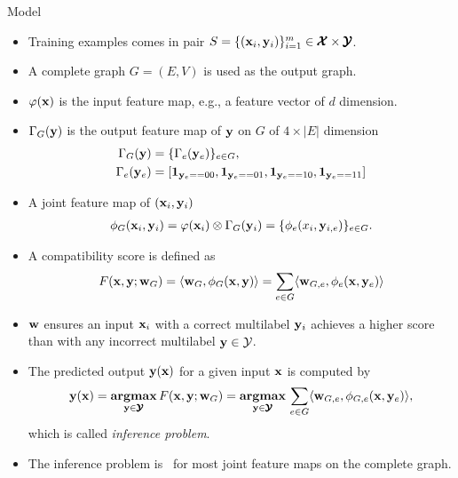 \documentclass[first=dgreen,second=purple,logo=yellowexc]{aaltoslides}
\begin{document}
%
\begin{frame}[allowframebreaks]{Model}
	\begin{itemize}\footnotesize
		\item Training examples comes in pair $S=\{(\mathbf {x}_i,\mathbf {y}_i)\}_{i=1}^{m}\in\pmb {\mathcal{X}}\times\pmb {\mathcal{Y}}$.
		\item A complete graph $G=(E,V)$ is used as the output graph.
		\item $\varphi(\mathbf {x})$ is the input feature map, e.g., a feature vector of $d$ dimension.
		\item $\Gamma_G(\mathbf {y})$ is the output feature map of $\mathbf {y}$ on $G$ of $4\times |E|$ dimension
		\begin{align*}
			\Gamma_G(\mathbf {y}) &= \{\Gamma_e(\mathbf {y}_{e})\}_{e\in G},\\
			 \Gamma_e(\mathbf {y}_{e}) &= [\mathbf {1}_{\mathbf {y}_{e}==00},\mathbf {1}_{\mathbf {y}_{e}==01},\mathbf {1}_{\mathbf {y}_{e}==10},\mathbf {1}_{\mathbf {y}_{e}==11}]
		\end{align*}
		\item A joint feature map of $(\mathbf {x}_i,\mathbf {y}_i)$
		\begin{align*}
			\phi_G(\mathbf {x}_i,\mathbf {y}_i) = \varphi(\mathbf {x}_i)\otimes\Gamma_G(\mathbf {y}_i) = \{\phi_e(x_i,\mathbf {y}_{i,e})\}_{e\in G}.
		\end{align*}
		\item A compatibility score is defined as
		\begin{align*}
			F(\mathbf {x},\mathbf {y};\mathbf {w}_G) = \langle \mathbf {w}_G, \phi_G(\mathbf {x},\mathbf {y}) \rangle=\sum_{e\in G}\langle \mathbf {w}_{G,e}, \phi_e(\mathbf {x},\mathbf {y}_{e}) \rangle
		\end{align*}
		\item $\mathbf {w}$ ensures an input $\mathbf {x}_i$ with a correct multilabel $\mathbf {y}_i$ achieves a higher score than with any incorrect multilabel $\mathbf {y}\in\mathcal{Y}$.
		\item The predicted output $\mathbf {y}(\mathbf {x})$ for a given input $\mathbf {x}$ is computed by
		\begin{align*}
			\mathbf {y}(\mathbf {x}) = \underset{\mathbf {y}\in\pmb {\mathcal{Y}}}{\textbf{argmax}}\,F(\mathbf {x},\mathbf {y};\mathbf {w}_G) = \underset{\mathbf {y}\in\pmb {\mathcal{Y}}}{\textbf{argmax}}\,\sum_{e\in G}\langle \mathbf {w}_{G,e}, \phi_{G,e}(\mathbf {x},\mathbf {y}_e) \rangle,
		\end{align*}
		which is called \textit{inference problem}.
		\item The {inference problem} is \nphard\ for most joint feature maps on the complete graph.
	\end{itemize}
\end{frame}
\end{document}
